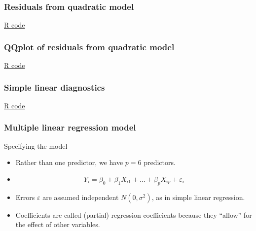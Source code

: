 \documentclass[handout]{beamer}
\begin{document}
   \begin{frame}
   \frametitle{Residuals from quadratic model}
   \begin{center}
   \end{center}
   \href{http://stats191.stanford.edu/simple_diagnostics.html#poorly-fitting-linear-model}{R code}
   \end{frame}



   \begin{frame}
   \frametitle{QQplot of residuals from quadratic model}
   \begin{center}
   \end{center}
   \href{http://stats191.stanford.edu/simple_diagnostics.html#poorly-fitting-linear-model}{R code}
   \end{frame}



   \begin{frame}
   \frametitle{Simple linear diagnostics}
   \begin{center}
   \end{center}
   \href{http://stats191.stanford.edu/simple_diagnostics.html#outlier-and-nonconstant-variance}{R code}
   \end{frame}


   \begin{frame} \frametitle{Multiple linear regression      model}

   \begin{block}
   {Specifying the model}

   \begin{itemize}

   \item Rather than one predictor, we have $p=6$ predictors.

   \item $$
   Y_i = \beta_0 + \beta_1 X_{i1} + \dots + \beta_p X_{ip} + \varepsilon_i
   $$

   \item Errors $\varepsilon$ are assumed independent $N(0,\sigma^2)$, as in simple linear regression.

   \item Coefficients are called (partial) regression coefficients because they ``allow'' for the effect of other variables.

   \end{itemize}
   \end{block}
   \end{frame}
\end{document}
